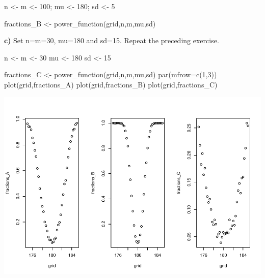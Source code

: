 \documentclass[
]{article}
\newenvironment{Shaded}{\begin{snugshade}}{\end{snugshade}}
\newcommand{\AttributeTok}[1]{\textcolor[rgb]{0.77,0.63,0.00}{#1}}
\newcommand{\DecValTok}[1]{\textcolor[rgb]{0.00,0.00,0.81}{#1}}
\newcommand{\FunctionTok}[1]{\textcolor[rgb]{0.00,0.00,0.00}{#1}}
\newcommand{\NormalTok}[1]{#1}
\newcommand{\OtherTok}[1]{\textcolor[rgb]{0.56,0.35,0.01}{#1}}
\begin{document}
\begin{Shaded}
\begin{Highlighting}[]
\NormalTok{n }\OtherTok{\textless{}{-}}\NormalTok{ m }\OtherTok{\textless{}{-}} \DecValTok{100}\NormalTok{; mu }\OtherTok{\textless{}{-}} \DecValTok{180}\NormalTok{; sd }\OtherTok{\textless{}{-}} \DecValTok{5}

\NormalTok{fractions\_B }\OtherTok{\textless{}{-}} \FunctionTok{power\_function}\NormalTok{(grid,n,m,mu,sd)}
\end{Highlighting}
\end{Shaded}

\textbf{c)} Set n=m=30, mu=180 and sd=15. Repeat the preceding exercise.

\begin{Shaded}
\begin{Highlighting}[]
\NormalTok{n }\OtherTok{\textless{}{-}}\NormalTok{ m }\OtherTok{\textless{}{-}} \DecValTok{30}
\NormalTok{mu }\OtherTok{\textless{}{-}} \DecValTok{180}
\NormalTok{sd }\OtherTok{\textless{}{-}} \DecValTok{15}

\NormalTok{fractions\_C }\OtherTok{\textless{}{-}} \FunctionTok{power\_function}\NormalTok{(grid,n,m,mu,sd)}
\FunctionTok{par}\NormalTok{(}\AttributeTok{mfrow=}\FunctionTok{c}\NormalTok{(}\DecValTok{1}\NormalTok{,}\DecValTok{3}\NormalTok{))}
\FunctionTok{plot}\NormalTok{(grid,fractions\_A)}
\FunctionTok{plot}\NormalTok{(grid,fractions\_B)}
\FunctionTok{plot}\NormalTok{(grid,fractions\_C)}
\end{Highlighting}
\end{Shaded}

\includegraphics{Assignment-1_files/figure-latex/unnamed-chunk-6-1.pdf}
\end{document}
